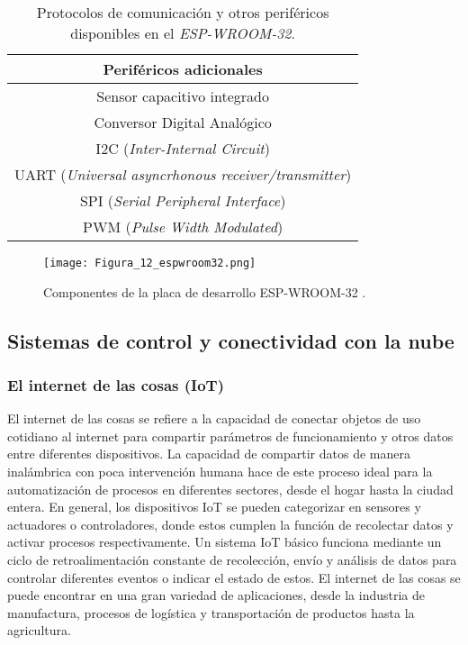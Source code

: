 \begin{table}[H]
	\centering
	\begin{tabular}{|c|c|}
		\hline
		\multicolumn{2}{|c|}{\textbf{Periféricos adicionales}}\\ \hline
		\multicolumn{2}{|c|}{Sensor capacitivo integrado}\\ \hline
		\multicolumn{2}{|c|}{Conversor Digital Analógico}\\ \hline
		\multicolumn{2}{|c|}{I2C (\textit{Inter-Internal Circuit})}\\ \hline
		\multicolumn{2}{|c|}{UART (\textit{Universal asyncrhonous receiver/transmitter})}\\ \hline
		\multicolumn{2}{|c|}{SPI (\textit{Serial Peripheral Interface})}\\ \hline
		\multicolumn{2}{|c|}{PWM (\textit{Pulse Width Modulated})}\\ \hline
	\end{tabular}
	\caption{Protocolos de comunicación y otros periféricos disponibles en el \textit{ESP-WROOM-32}.}
	\label{Cuadro7}
\end{table}

\begin{figure}[H]
	\centering
	\texttt{[image: Figura\_12\_espwroom32.png]}
	\caption{Componentes de la placa de desarrollo ESP-WROOM-32 \cite{electronic_wings_espwroom32}.}
	\label{fig:mesh12}
\end{figure}

\subsection*{Sistemas de control y conectividad con la nube}

\subsubsection*{El internet de las cosas (IoT)}
El internet de las cosas se refiere a la capacidad de conectar objetos de uso cotidiano al internet para compartir parámetros de funcionamiento y otros datos entre diferentes dispositivos. La capacidad de compartir datos de manera inalámbrica con poca intervención humana hace de este proceso ideal para la automatización de procesos en diferentes sectores, desde el hogar hasta la ciudad entera. En general, los dispositivos IoT se pueden categorizar en sensores y actuadores o controladores, donde estos cumplen la función de recolectar datos y activar procesos respectivamente. Un sistema IoT básico funciona mediante un ciclo de retroalimentación constante de recolección, envío y análisis de datos para controlar diferentes eventos o indicar el estado de estos. El internet de las cosas se puede encontrar en una gran variedad de aplicaciones, desde la industria de manufactura, procesos de logística y transportación de productos hasta la agricultura. \cite{redhat_IoT_2019}

